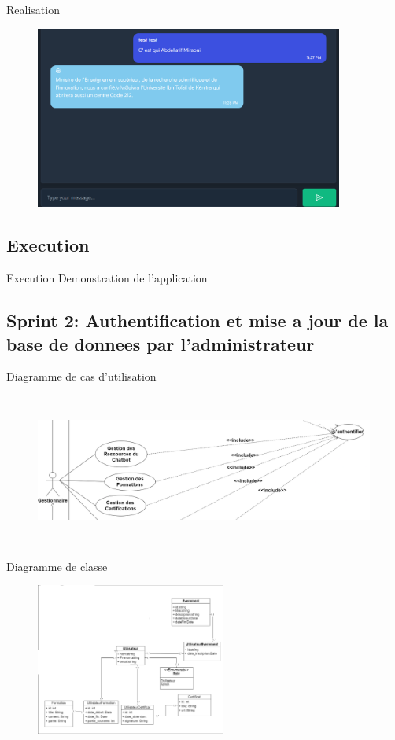 \documentclass{beamer}
\begin{document}
\begin{frame}{Realisation}
\begin{figure}[htpb]
        \centering
        \includegraphics[height=6cm]{pic/chat2.png}
\end{figure}
\end{frame}

\subsection{Execution}
\begin{frame}{Execution}
    Demonstration de l'application
\end{frame}


\subsection{Sprint 2: Authentification et mise a jour de la
base de donnees par l’administrateur}
\begin{frame}{Diagramme de cas d'utilisation}

\begin{figure}[htpb]
        \centering
        \includegraphics[height=5cm]{pic/sprint2-usecase.png}
\end{figure}
\end{frame}

\begin{frame}{Diagramme de classe}

\begin{figure}[htpb]
        \centering
        \includegraphics[height=5cm]{pic/sprint2-class.png}
\end{figure}
\end{frame}
\end{document}
